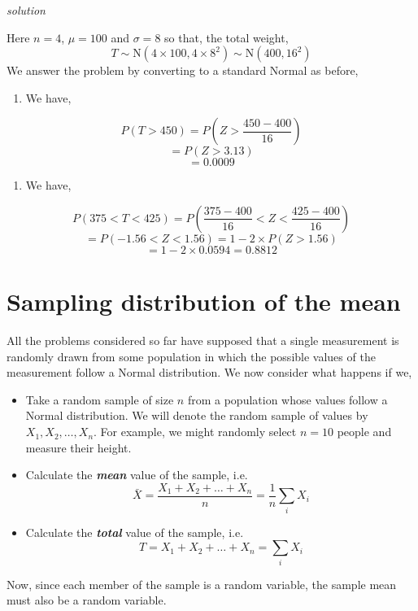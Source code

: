 \documentclass[
]{book}
\providecommand{\tightlist}{%
  \setlength{\itemsep}{0pt}\setlength{\parskip}{0pt}}
\theoremstyle{definition}
\theoremstyle{definition}
\theoremstyle{definition}
\theoremstyle{definition}
\theoremstyle{remark}
\begin{document}
\emph{solution}

Here \(n=4\), \(\mu=100\) and \(\sigma=8\) so that, the total weight,
\[ T\sim \text{N}({4\times 100},{4\times 8^2})\sim \text{N}({400},{16^2}) \]
We answer the problem by converting to a standard Normal as before,

\begin{enumerate}
\def\labelenumi{\alph{enumi})}
\tightlist
\item
  We have,
\end{enumerate}

\[P(T>450)  =  P\left(Z>\frac{450-400}{16}\right)\]
\[=  P(Z>3.13)\]
\[ =  0.0009\]

\begin{enumerate}
\def\labelenumi{\alph{enumi})}
\setcounter{enumi}{1}
\tightlist
\item
  We have,
\end{enumerate}

\[P(375<T<425)  =  P\left(\frac{375-400}{16}<Z<\frac{425-400}{16}\right) \]
\[=  P(-1.56<Z<1.56)=1-2\times P(Z>1.56)\]
\[=  1-2\times 0.0594=0.8812\]

\hypertarget{sampling-distribution-of-the-mean}{%
\section{Sampling distribution of the mean}\label{sampling-distribution-of-the-mean}}

All the problems considered so far have supposed that a single
measurement is randomly drawn from some population in which the
possible values of the measurement follow a Normal distribution.
We now consider what happens if we,

\begin{itemize}
\item
  Take a random sample of size \(n\) from a population whose
  values follow a Normal distribution. We will denote the random sample of
  values by \(X_1,X_2,\ldots,X_n\). For example, we might
  randomly select \(n=10\) people and measure their height.
\item
  Calculate the \textbf{\emph{mean}} value of the sample, i.e.~
  \[\bar{X}=\frac{X_1+X_2+\ldots+X_n}{n}=\frac{1}{n}\sum_i X_i\]
\item
  Calculate the \textbf{\emph{total}} value of the sample, i.e.~
  \[T = X_1+X_2+\ldots+X_n =\sum_i X_i\]
\end{itemize}

Now, since each member of the sample is a random variable, the sample mean must also be a random variable.
\end{document}
